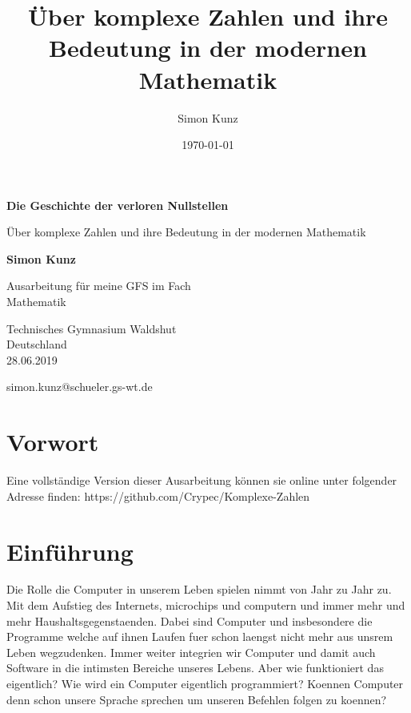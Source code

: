 \documentclass[a4paper, 12pt]{article}
\title{Über komplexe Zahlen und ihre Bedeutung in der modernen Mathematik}
\author{Simon Kunz}
\date{\today}
\begin{document}
\begin{titlepage}
   \begin{center}
       \vspace*{2cm}
 
       \textbf{Die Geschichte der verloren Nullstellen}
 
       \vspace{0.5cm}
       Über komplexe Zahlen und ihre Bedeutung in der modernen Mathematik
 
       \vspace{1.5cm}
 
       \textbf{Simon Kunz}
 
       \vspace{5cm}
         
       Ausarbeitung für meine GFS im Fach\\
       Mathematik
 
       \vspace{0.8cm}
 
       \vspace{0.8cm}

       Technisches Gymnasium Waldshut\\
       Deutschland\\
       28.06.2019

       simon.kunz@schueler.gs-wt.de
   \end{center}
\end{titlepage}



\clearpage
\tableofcontents
\clearpage


\section{Vorwort}
Eine vollständige Version dieser Ausarbeitung können sie online unter folgender Adresse finden: https://github.com/Crypec/Komplexe-Zahlen

\section{Einführung}
Die Rolle die Computer in unserem Leben spielen nimmt von Jahr zu Jahr
zu. Mit dem Aufstieg des Internets, microchips und computern und immer
mehr und mehr Haushaltsgegenstaenden. Dabei sind Computer und
insbesondere die Programme welche auf ihnen Laufen fuer schon laengst
nicht mehr aus unsrem Leben wegzudenken.
Immer weiter integrien wir Computer und damit auch Software in die
intimsten Bereiche unseres Lebens. Aber wie funktioniert das
eigentlich? Wie wird ein Computer eigentlich programmiert?
Koennen Computer denn schon unsere Sprache sprechen um unseren
Befehlen folgen zu koennen?
\end{document}
